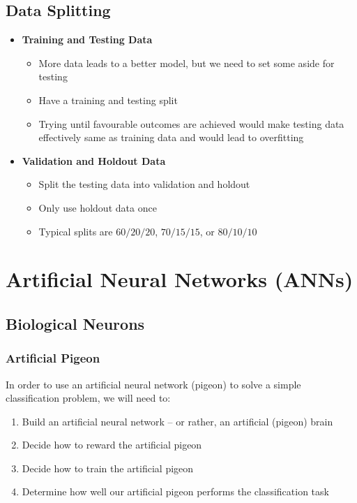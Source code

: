 \documentclass[11pt]{article}
\begin{document}
\subsection{Data Splitting}
\begin{itemize}
\item \textbf{Training and Testing Data}
\begin{itemize}
\item More data leads to a better model, but we need to set some aside for testing
\item Have a training and testing split
\item Trying until favourable outcomes are achieved would make testing data effectively same as training data and would lead to overfitting
\end{itemize}
\item \textbf{Validation and Holdout Data}
\begin{itemize}
\item Split the testing data into validation and holdout
\item Only use holdout data once
\item Typical splits are $60/20/20$, $70/15/15$,  or $80/10/10$
\end{itemize}
\end{itemize}


\pagebreak



\section{Artificial Neural Networks (ANNs)}

\subsection{Biological Neurons}
\subsubsection{Artificial Pigeon}
In order to use an artificial neural network (pigeon) to solve a simple classification problem, we will need to:
\begin{enumerate}
\item Build an artificial neural network -- or rather,  an artificial (pigeon) brain
\item Decide how to reward the artificial pigeon
\item Decide how to train the artificial pigeon
\item Determine how well our artificial pigeon performs the classification task
\end{enumerate}
\end{document}
